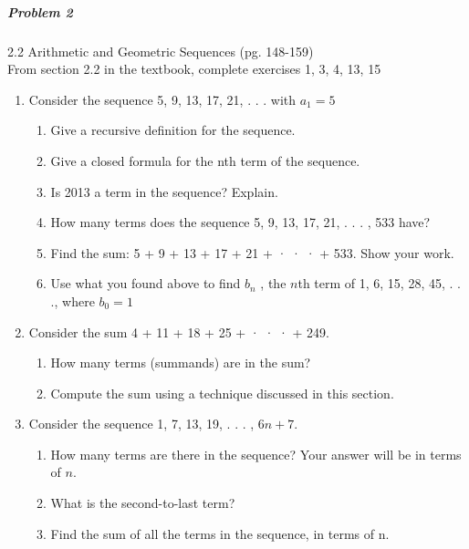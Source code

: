 \documentclass[11pt,a4paper]{article}
\newcommand\setItemNumber[1]{\setcounter{enumi}{\numexpr#1-1\relax}}
\begin{document}
	\subparagraph{Problem 2} 2.2 Arithmetic and Geometric Sequences (pg. 148-159)\\
	
		From section 2.2 in the textbook, complete exercises 1, 3, 4, 13, 15
	
        \begin{enumerate}

            \item Consider the sequence 5, 9, 13, 17, 21, . . . with $a_1 = 5$
                \begin{enumerate}

                \item Give a recursive definition for the sequence.
                \item Give a closed formula for the nth term of the sequence.
                \item Is 2013 a term in the sequence? Explain.
                \item How many terms does the sequence 5, 9, 13, 17, 21, . . . , 533 have?
                \item Find the sum: 5 + 9 + 13 + 17 + 21 + · · · + 533. Show your work.
                \item Use what you found above to find $b_n$ , the $n$th term of 1, 6, 15, 28, 45, . . ., where $b_0 = 1$
                \end{enumerate}


            \setItemNumber{3}
            \item Consider the sum 4 + 11 + 18 + 25 + · · · + 249.
                \begin{enumerate}
                    \item How many terms (summands) are in the sum?
                    \item Compute the sum using a technique discussed in this section.
                \end{enumerate}

            \item Consider the sequence 1, 7, 13, 19, . . . , $6n + 7$.
                \begin{enumerate}
                    \item How many terms are there in the sequence? Your answer will be in terms of $n$.
                    \item What is the second-to-last term?
                    \item Find the sum of all the terms in the sequence, in terms of n.
                \end{enumerate}



\end{enumerate}
\end{document}
